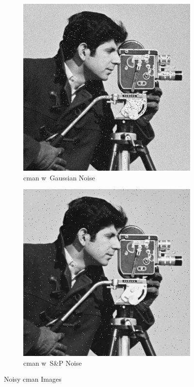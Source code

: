 \documentclass{article}
\begin{document}
\begin{figure}[h!]
	\centering
	\begin{subfigure}[b]{0.45\linewidth}
		\includegraphics[width=\linewidth]{../../2_Software/data/cman_gnoise.png}
		\caption{cman w\ Gaussian Noise}
	\end{subfigure}
	\begin{subfigure}[b]{0.45\linewidth}
		\includegraphics[width=\linewidth]{../../2_Software/data/cman_spnoise.png}
		\caption{cman w\ S\&P Noise}
	\end{subfigure}
	\caption{Noisy cman Images}
	\label{fig:noisy_cman}
\end{figure}
\end{document}
